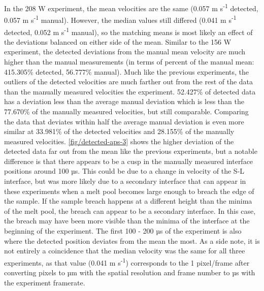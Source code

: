 In the 208 W experiment, the mean velocities are
the same (0.057 m s\textsuperscript{-1} detected,
0.057 m s\textsuperscript{-1} manual). However, the median
values still differed (0.041 m s\textsuperscript{-1} detected,
0.052 m s\textsuperscript{-1} manual),
so the matching means is most likely an effect of the deviations
balanced on either side of the mean. Similar to the 156 W
experiment, the detected deviations from the manual mean velocity are much
higher than the manual measurements (in terms of percent of the
manual mean: 415.305\% detected, 56.777\% manual).
Much like the previous experiments, the outliers of the detected velocities
are much farther out from the rest of the data than the manually measured
velocities the experiment. 52.427\% of detected data has a deviation less
than the average manual deviation which is less than the 77.670\% of
the manually measured velocities, but still comparable. Comparing the data
that deviates within half the average manual deviation is even more similar
at 33.981\% of the detected velocities and 28.155\% of the manually
measured velocities. \ref{fig/detected-aps-3} shows the higher
deviation of the detected data far out from the mean like the previous
experiments, but a notable difference is that there appears to be a cusp in
the manually measured interface positions around 100 µs. This could be due
to a change in velocity of the S-L interface, but was more likely
due to a secondary interface that can appear in these experiments when a
melt pool becomes large enough to breach the edge of the sample. If the
sample breach happens at a different height than the minima of the melt pool,
the breach can appear to be a secondary interface. In this case, the breach
may have been more visible than the minima of the interface at the beginning
of the experiment. The first 100 - 200 µs of the experiment is also where
the detected position deviates from the mean the most.
As a side note, it is not entirely a coincidence that the median
velocity was the same for all
three experiments, as that value (0.041 m s\textsuperscript{-1})
corresponds to the 1 pixel/frame after converting pixels to µm with the
spatial resolution and frame number to µs with the experiment framerate.

